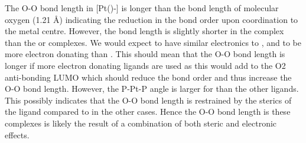 The O-O bond length in [Pt(\tButhixantphos)\hapto{}-] is longer than the bond length of molecular oxygen (1.21 \si{\angstrom}) indicating the reduction in the bond order upon coordination to the metal centre.  However, the bond length is slightly shorter in the \tButhixantphos{} complex than the  or  complexes.  We would expect \tButhixantphos{} to have similar electronics to , and to be more electron donating than .  This should mean that the O-O bond length is longer if more electron donating ligands are used as this would add to the O2 anti-bonding LUMO which should reduce the bond order and thus increase the O-O bond length.   However, the P-Pt-P angle is larger for \tButhixantphos{} than the other ligands.  This possibly indicates that the O-O bond length is restrained by the sterics of the \tButhixantphos{} ligand compared to in the other cases.  Hence the O-O bond length is these complexes is likely the result of a combination of both steric and electronic effects.

